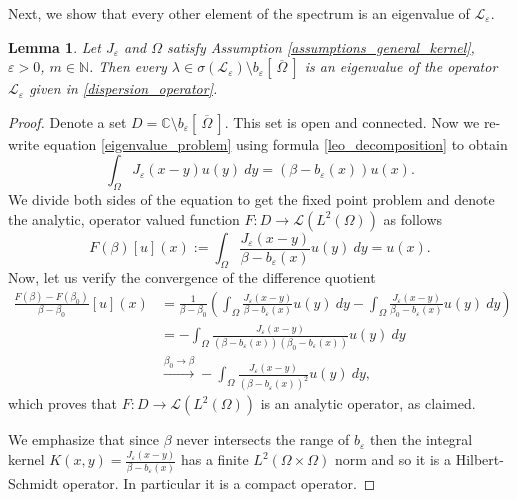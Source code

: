 \documentclass[12pt, a4paper]{article}
\theoremstyle{break}
\theoremstyle{break}
\theoremstyle{break}
\theoremstyle{break}
\newtheorem{lem}{Lemma}[section]
\theoremstyle{break}
\newcommand{\Leo}{\mathcal{L}_{\varepsilon}}
\newcommand{\Leb}{L^2\left(\Omega\right)}
\begin{document}
Next, we show that every other element of the spectrum is an eigenvalue of $\Leo$.
\begin{lem} \label{lem:spectrum_remaining_elements}
    Let $J_\varepsilon$ and $\Omega$ satisfy Assumption \ref{assumptions_general_kernel}, $\varepsilon > 0$, $m \in \mathbb{N}$. Then every $\lambda \in \sigma(\Leo) \setminus b_\varepsilon\left[\:\overline{\Omega}\:\right]$ is an eigenvalue of the operator $\Leo$ given in \eqref{dispersion_operator}.
\end{lem}
\begin{proof}
    Denote a set $D = \mathbb{C} \setminus b_\varepsilon \left[\: \overline{\Omega} \:\right]$. This set is open and connected. Now we re-write equation \eqref{eigenvalue_problem} using formula \eqref{leo_decomposition} to obtain
    \begin{equation*}
        \int_\Omega J_\varepsilon(x-y) u(y)\:dy = \left( \beta - b_\varepsilon(x)\right) u(x).
    \end{equation*}
    We divide both sides of the equation to get the fixed point problem and denote the analytic, operator valued function $F: D \rightarrow \mathcal{L}(L^2(\Omega))$ as follows
    \begin{equation*}
        F(\beta)[u](x) := \int_\Omega \frac{J_\varepsilon(x-y)}{\beta - b_\varepsilon(x)}u(y)\:dy = u(x).
    \end{equation*}
    Now, let us verify the convergence of the difference quotient
    \begin{align*}
        \frac{F(\beta) - F(\beta_0)}{\beta - \beta_0} [u] (x) 
        &= \frac{1}{\beta - \beta_0}\left(\int_\Omega \frac{J_\varepsilon(x-y)}{\beta - b_\varepsilon(x)}u(y)\:dy - \int_\Omega \frac{J_\varepsilon(x-y)}{\beta_0 - b_\varepsilon(x)}u(y)\:dy\right) \\
        &= -\int_\Omega \frac{J_\varepsilon(x-y)}{(\beta - b_\varepsilon(x))(\beta_0 - b_\varepsilon(x))}u(y)\:dy \\
        &\xrightarrow{\beta_0 \rightarrow \beta} -\int_\Omega \frac{J_\varepsilon(x-y)}{(\beta - b_\varepsilon(x))^2}u(y)\:dy,
    \end{align*}
    which proves that $F: D \rightarrow \mathcal{L}(\Leb)$ is an analytic operator, as claimed.
    
    We emphasize that since $\beta$ never intersects the range of $b_\varepsilon$ then the integral kernel $K(x,y) = \frac{J_\varepsilon(x-y)}{\beta - b_\varepsilon(x)}$ has a finite $L^2(\Omega \times \Omega)$ norm and so it is a Hilbert-Schmidt operator. In particular it is a compact operator. 
    

\end{proof}
\end{document}

